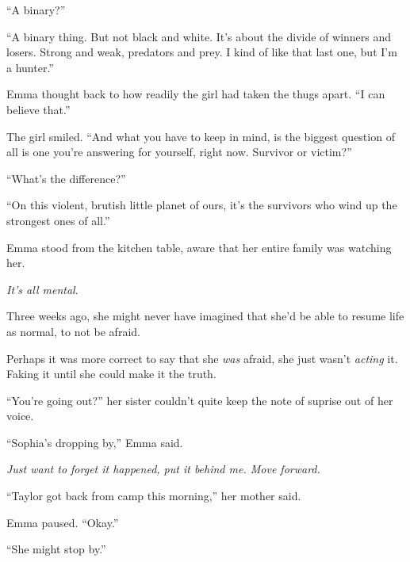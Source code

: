 ``A binary?''



``A binary thing.  But not black and white.  It's about the divide of winners and losers.  Strong and weak, predators and prey.  I kind of like that last one, but I'm a hunter.''



Emma thought back to how readily the girl had taken the thugs apart.  ``I can believe that.''



The girl smiled.  ``And what you have to keep in mind, is the biggest question of all is one you're answering for yourself, right now.  Survivor or victim?''



``What's the difference?''



``On this violent, brutish little planet of ours, it's the survivors who wind up the strongest ones of all.''



\sectionbreak



Emma stood from the kitchen table, aware that her entire family was watching her.



\emph{It's all mental}.



Three weeks ago, she might never have imagined that she'd be able to resume life as normal, to not be afraid.



Perhaps it was more correct to say that she \emph{was }afraid, she just wasn't \emph{acting} it.  Faking it until she could make it the truth.



``You're going out?'' her sister couldn't quite keep the note of suprise out of her voice.



``Sophia's dropping by,'' Emma said.



\emph{Just want to forget it happened, put it behind me.  Move forward.}



``Taylor got back from camp this morning,'' her mother said.



Emma paused.  ``Okay.''



``She might stop by.''



